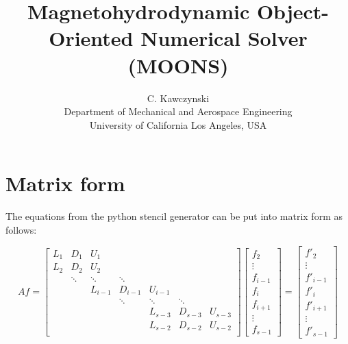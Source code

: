 \documentclass[landscape]{article}
\begin{document}
\doublespacing
\title{Magnetohydrodynamic Object-Oriented Numerical Solver (MOONS)}
\author{C. Kawczynski \\
Department of Mechanical and Aerospace Engineering \\
University of California Los Angeles, USA\\
}
\maketitle

\section{Matrix form}
The equations from the python stencil generator can be put into matrix form as follows:

\[ Af = \left[
\begin{array}{ccccccccc}
L_{1} & D_{1}    & U_{1}     &           &           &           &         \\
L_{2} & D_{2}    & U_{2}     &           &           &           &         \\
      & \ddots   & \ddots    & \ddots    &           &           &         \\
      &          & L_{i-1}   & D_{i-1}   & U_{i-1}   &           &         \\
      &          &           & \ddots    & \ddots    & \ddots    &         \\
      &          &           &           & L_{s-3}   & D_{s-3}   & U_{s-3} \\
      &          &           &           & L_{s-2}   & D_{s-2}   & U_{s-2} \\
\end{array} \right] 
\left[ \begin{array}{c}
f_{2} \\ \vdots \\ f_{i-1} \\ f_{i} \\ f_{i+1} \\ \vdots \\ f_{s-1}
\end{array} \right]
=
\left[ \begin{array}{c}
f'_{2} \\ \vdots \\ f'_{i-1} \\ f'_{i} \\ f'_{i+1} \\ \vdots \\ f'_{s-1}
\end{array} \right]
\]
\end{document}

